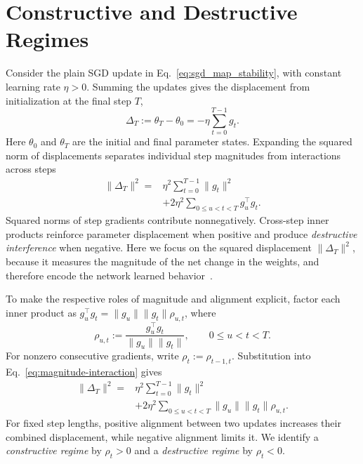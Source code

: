 \section{Constructive and Destructive Regimes}
\label{sec:displacement}\label{sec:regimes}


Consider the plain SGD update in Eq.~\eqref{eq:sgd_map_stability}, with constant learning rate $\eta>0$. Summing the updates gives the displacement from initialization at the final step $T$,
\begin{equation}
  \Delta_T:=\theta_T-\theta_0=-\eta\sum_{t=0}^{T-1} g_t.
  \label{eq:displacement}
\end{equation}
Here $\theta_0$ and $\theta_T$ are the initial and final parameter states. Expanding the squared norm of displacements separates individual step magnitudes from interactions across steps
\begin{equation}
\begin{aligned}
  \|\Delta_T\|^2
  ={}&\eta^2\sum_{t=0}^{T-1}\|g_t\|^2\\
     &+2\eta^2\sum_{0\leq u<t<T}g_u^\top g_t.
\end{aligned}
\label{eq:magnitude-interaction}
\end{equation}
Squared norms of step gradients contribute nonnegatively. Cross-step inner products reinforce parameter displacement when positive and produce \emph{destructive interference} when negative. Here we focus on the squared displacement $\|\Delta_T\|^2$, because it measures the magnitude of the net change in the weights, and therefore encode the network learned behavior~\cite{ilharco2023task, nagarajan2019distance}.

To make the respective roles of magnitude and alignment explicit, factor each inner product as $g_u^\top g_t=\|g_u\|\|g_t\|\rho_{u,t}$, where
\begin{equation}
  \rho_{u,t}:=\frac{g_u^\top g_t}{\|g_u\|\|g_t\|},
  \qquad 0\leq u<t<T.
  \label{eq:rho}
\end{equation}
For nonzero consecutive gradients, write $\rho_t:=\rho_{t-1,t}$. Substitution into Eq.~\eqref{eq:magnitude-interaction} gives
\begin{equation}
\begin{aligned}
\|\Delta_T\|^2={}&\eta^2\sum_{t=0}^{T-1}\|g_t\|^2\\
 &+2\eta^2\sum_{0\leq u<t<T}
    \|g_u\|\|g_t\|\rho_{u,t}.
\end{aligned}
\label{eq:magnitude-alignment}
\end{equation}
For fixed step lengths, positive alignment between two updates increases their combined displacement, while negative alignment limits it. We identify a \emph{constructive regime} by $\rho_t>0$ and a \emph{destructive regime} by $\rho_t<0$.


